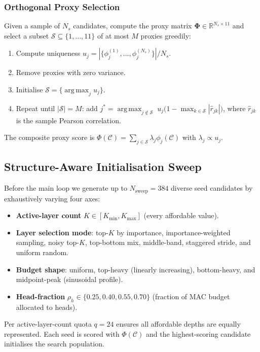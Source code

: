 \documentclass{article}
\newcommand{\Cc}{\mathcal{C}}
\newcommand{\Sc}{\mathcal{S}}
\newcommand{\R}{\mathbb{R}}
\newcommand{\argmax}{\mathop{\mathrm{arg\,max}}}
\begin{document}
\subsubsection{Orthogonal Proxy Selection}

Given a sample of $N_s$ candidates, compute the proxy matrix
$\bm{\Phi}\in\R^{N_s\times 11}$ and select a subset
$\Sc\subseteq\{1,\ldots,11\}$ of at most $M$ proxies greedily:

\begin{enumerate}[leftmargin=*]
  \item Compute uniqueness $u_j = |\{\phi_j^{(1)},\ldots,\phi_j^{(N_s)}\}|/N_s$.
  \item Remove proxies with zero variance.
  \item Initialise $\Sc = \{\argmax_j u_j\}$.
  \item Repeat until $|\Sc|=M$: add
    $j^* = \argmax_{j\notin\Sc}\; u_j\bigl(1 - \max_{k\in\Sc}|\hat{r}_{jk}|\bigr)$,
    where $\hat{r}_{jk}$ is the sample Pearson correlation.
\end{enumerate}

The composite proxy score is
$\Phi(\Cc) = \sum_{j\in\Sc}\lambda_j\phi_j(\Cc)$ with
$\lambda_j \propto u_j$.

\subsection{Structure-Aware Initialisation Sweep}
\label{sec:sweep}

Before the main loop we generate up to $N_{\mathrm{sweep}}=384$
diverse seed candidates by exhaustively varying four axes:

\begin{itemize}[leftmargin=*]
  \item \textbf{Active-layer count} $K \in [K_{\min}, K_{\max}]$
        (every affordable value).
  \item \textbf{Layer selection mode}: top-$K$ by importance,
        importance-weighted sampling, noisy top-$K$, top-bottom mix,
        middle-band, staggered stride, and uniform random.
  \item \textbf{Budget shape}: uniform, top-heavy (linearly increasing),
        bottom-heavy, and midpoint-peak (sinusoidal profile).
  \item \textbf{Head-fraction} $\rho_h \in \{0.25, 0.40, 0.55, 0.70\}$
        (fraction of MAC budget allocated to heads).
\end{itemize}

Per active-layer-count quota $q = 24$ ensures all affordable depths are
equally represented.  Each seed is scored with $\Phi(\Cc)$ and the
highest-scoring candidate initialises the search population.
\end{document}
